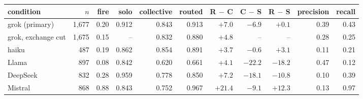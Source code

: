{\setlength{\tabcolsep}{4pt}\begin{tabular}{@{}lrrrrrrrrrr@{}}
\toprule
condition & $n$ & fire & solo & collective & routed & R $-$ C & C $-$ S & R $-$ S & precision & recall \\
\midrule
grok (primary) & 1,677 & 0.20 & 0.912 & 0.843 & 0.913 & $+7.0$ & $-6.9$ & $+0.1$\rlap{\smash{$^{\circ}$}} & 0.39 & 0.43 \\
grok, exchange cut & 1,675 & 0.15 & -- & 0.832 & 0.880 & $+4.8$ & -- & -- & 0.28 & 0.25 \\
haiku & 487 & 0.19 & 0.862 & 0.854 & 0.891 & $+3.7$ & $-0.6$\rlap{\smash{$^{\circ}$}} & $+3.1$\rlap{\smash{$^{\circ}$}} & 0.11 & 0.21 \\
Llama & 897 & 0.08 & 0.842 & 0.620 & 0.661 & $+4.1$ & $-22.2$ & $-18.2$ & 0.47 & 0.12 \\
DeepSeek & 832 & 0.28 & 0.959 & 0.778 & 0.850 & $+7.2$ & $-18.1$ & $-10.8$ & 0.10 & 0.39 \\
Mistral & 868 & 0.88 & 0.843 & 0.752 & 0.967 & $+21.4$ & $-9.1$ & $+12.3$ & 0.13 & 0.97 \\
\bottomrule
\end{tabular}}
